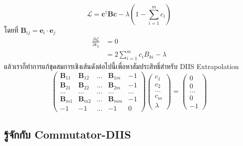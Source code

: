 %
\begin{equation}
  \mathcal{L}
  =
  \mathbf{c}^\dagger \mathbf{B} \mathbf{c} - \lambda \left( 1-\sum_{i=1}^m c_i \right)
\end{equation}
%
โดยที่ $\mathbf{B}_{ij} = \mathbf{e}_i \cdot \mathbf{e}_j$
%
\begin{align}
  \frac{\partial\mathcal{L}}{\partial c_k}
   & =
  0    \\
   & =
  2 \sum_{i=1}^m c_i B_{ki} -\lambda
\end{align}
%
แล้วเราก็ทำการแก้ชุดสมการเชิงเส้นดังต่อไปนี้เพื่อหาสัมประสิทธิ์สำหรับ DIIS Extrapolation
%
\begin{equation}
  \begin{pmatrix}
    \mathbf{B}_{11} & \mathbf{B}_{12} & \dots & \mathbf{B}_{1m} & -1    \\
    \mathbf{B}_{21} & \mathbf{B}_{22} & \dots & \mathbf{B}_{2m} & -1    \\
    \dots           & \dots           & \dots & \dots           & \dots \\
    \mathbf{B}_{m1} & \mathbf{B}_{m2} & \dots & \mathbf{B}_{mm} & -1    \\
    -1              & -1              & \dots & -1              & 0
  \end{pmatrix}
  \begin{pmatrix}
    c_1 \\ c_2 \\ \dots \\ c_m \\ \lambda
  \end{pmatrix}
  =
  \begin{pmatrix}
    0 \\ 0 \\ \dots \\ 0 \\ -1
  \end{pmatrix}
\end{equation}

\subsection{รู้จักกับ Commutator-DIIS}

